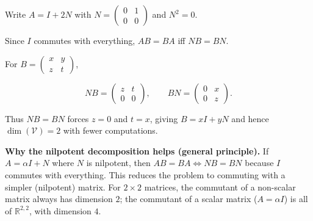 \begin{extension}[title={Extension (Tutorial 3, Question 4, Method 2)}]

Write $A=I+2N$ with $N=\begin{pmatrix}0&1\\0&0\end{pmatrix}$ and $N^2=0$.

Since $I$ commutes with everything, $AB=BA$ iff $NB=BN$.

For $B=\begin{pmatrix}x&y\\ z&t\end{pmatrix}$,

\[
NB=\begin{pmatrix}z&t\\0&0\end{pmatrix},
\qquad
BN=\begin{pmatrix}0&x\\0&z\end{pmatrix}.
\]

Thus $NB=BN$ forces $z=0$ and $t=x$, giving $B=xI+yN$ and hence $\dim(\mathcal{V})=2$ with fewer computations.

\end{extension}

\begin{policynote}
\textbf{Why the nilpotent decomposition helps (general principle).}
If $A=\alpha I+N$ where $N$ is nilpotent, then $AB=BA\iff NB=BN$ because $I$ commutes with everything.
This reduces the problem to commuting with a simpler (nilpotent) matrix.
For $2\times 2$ matrices, the commutant of a non-scalar matrix always has dimension $2$; the commutant of a scalar matrix ($A=\alpha I$) is all of $\mathbb{R}^{2,2}$, with dimension $4$.
\end{policynote}

